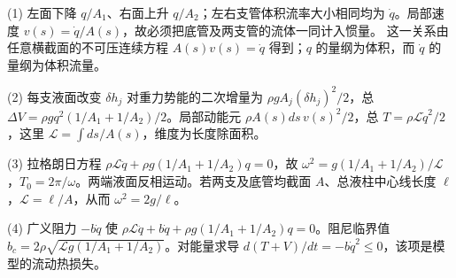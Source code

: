 (1) 左面下降 \(q/A_1\)、右面上升 \(q/A_2\)；左右支管体积流率大小相同均为 \(\dot q\)。局部速度 \(v(s)=\dot q/A(s)\)，故必须把底管及两支管的流体一同计入惯量。 这一关系由任意横截面的不可压连续方程 \(A(s)v(s)=\dot q\) 得到；\(q\) 的量纲为体积，而 \(\dot q\) 的量纲为体积流量。

(2) 每支液面改变 \(\delta h_j\) 对重力势能的二次增量为 \(\rho gA_j(\delta h_j)^2/2\)，总 \(\Delta V=\rho gq^2(1/A_1+1/A_2)/2\)。局部动能元 \(\rho A(s)ds\,v(s)^2/2\)，总 \(T=\rho\mathcal L\dot q^2/2\)，这里 \(\mathcal L=\int ds/A(s)\)，维度为长度除面积。

(3) 拉格朗日方程 \(\rho\mathcal L\ddot q+\rho g(1/A_1+1/A_2)q=0\)，故 \(\omega^2=g(1/A_1+1/A_2)/\mathcal L\)，\(T_0=2\pi/\omega\)。两端液面反相运动。若两支及底管均截面 \(A\)、总液柱中心线长度 \(\ell\)，\(\mathcal L=\ell/A\)，从而 \(\omega^2=2g/\ell\)。

(4) 广义阻力 \(-b\dot q\) 使 \(\rho\mathcal L\ddot q+b\dot q+\rho g(1/A_1+1/A_2)q=0\)。阻尼临界值 \(b_c=2\rho\sqrt{\mathcal Lg(1/A_1+1/A_2)}\)。对能量求导 \(d(T+V)/dt=-b\dot q^2\le0\)，该项是模型的流动热损失。
